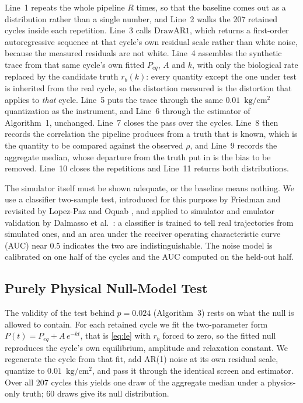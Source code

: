 \documentclass[runningheads]{llncs}
\newcommand{\pu}{\ensuremath{\mathrm{kg/cm^{2}}}}
\newcommand{\rb}{\ensuremath{r_{b}}}
\begin{document}
Line~1 repeats the whole
pipeline $R$ times, so that the baseline comes out as a distribution
rather than a single number, and Line~2 walks the $207$ retained
cycles inside each repetition. Line~3 calls $\mathrm{DrawAR1}$, which
returns a first-order autoregressive sequence at that cycle's own
residual scale rather than white noise, because the measured
residuals are not white. Line~4 assembles the synthetic
trace from that same cycle's own fitted $P_{eq}$, $A$ and $k$, with
only the biological rate replaced by the candidate truth $\rb(k)$:
every quantity except the one under test is inherited from the real
cycle, so the distortion measured is the distortion that applies to
\emph{that} cycle. Line~5 puts the trace through the same
$0.01$~\pu{} quantization as the instrument, and Line~6 through the
estimator of Algorithm~1, unchanged. Line~7 closes the pass over the
cycles. Line~8 then records the correlation the pipeline produces
from a truth that is known, which is the quantity to be compared
against the observed $\rho$, and Line~9 records the aggregate median,
whose departure from the truth put in is the bias to be removed.
Line~10 closes the repetitions and Line~11 returns both
distributions.

The simulator itself must be shown adequate, or the baseline means
nothing. We use a classifier two-sample test, introduced for this
purpose by Friedman \cite{friedman2003multivariate} and revisited by
Lopez-Paz and Oquab \cite{lopezpaz2017revisiting}, and applied to
simulator and emulator validation by Dalmasso et
al.~\cite{dalmasso2020validation}: a classifier is trained to tell real
trajectories from simulated ones, and an area under the receiver
operating characteristic curve (AUC) near $0.5$ indicates the
two are indistinguishable. The noise model is calibrated on one half of
the cycles and the AUC computed on the held-out half.

\subsection{Purely Physical Null-Model Test}
\label{sec:null}

The validity of the test behind $p=0.024$ (Algorithm~3) rests on what the null is
allowed to contain. For each retained cycle we fit the two-parameter
form $P(t)=P_{eq}+A\,e^{-kt}$, that is \eqref{eq:le} with $\rb$ forced
to zero, so the fitted null reproduces the cycle's own equilibrium,
amplitude and relaxation constant. We regenerate the cycle from that
fit, add AR(1) noise at its own residual scale, quantize to
$0.01$~\pu{}, and pass it through the identical screen and estimator.
Over all $207$ cycles this yields one draw of the aggregate median
under a physics-only truth; $60$ draws give its null distribution.
\end{document}
